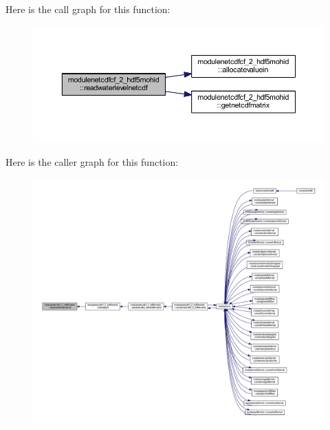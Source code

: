 Here is the call graph for this function\+:\nopagebreak
\begin{figure}[H]
\begin{center}
\leavevmode
\includegraphics[width=350pt]{namespacemodulenetcdfcf__2__hdf5mohid_a09c9e8d6a98c36d9bf0fe0c733ded2ce_cgraph}
\end{center}
\end{figure}
Here is the caller graph for this function\+:\nopagebreak
\begin{figure}[H]
\begin{center}
\leavevmode
\includegraphics[width=350pt]{namespacemodulenetcdfcf__2__hdf5mohid_a09c9e8d6a98c36d9bf0fe0c733ded2ce_icgraph}
\end{center}
\end{figure}
\mbox{\label{namespacemodulenetcdfcf__2__hdf5mohid_aebb4610701d55eaa0ab3294968f44ff9}} 
